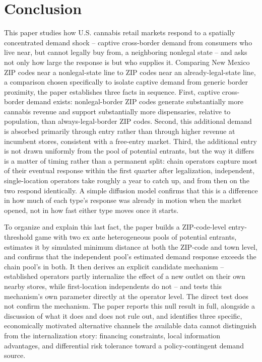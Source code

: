 \documentclass[english,12pt]{article}
\begin{document}
\section{Conclusion}
\label{conclusion}

This paper studies how U.S. cannabis retail markets respond to a spatially concentrated demand shock -- captive cross-border demand from consumers who live near, but cannot legally buy from, a neighboring nonlegal state -- and asks not only how large the response is but who supplies it. Comparing New Mexico ZIP codes near a nonlegal-state line to ZIP codes near an already-legal-state line, a comparison chosen specifically to isolate captive demand from generic border proximity, the paper establishes three facts in sequence. First, captive cross-border demand exists: nonlegal-border ZIP codes generate substantially more cannabis revenue and support substantially more dispensaries, relative to population, than always-legal-border ZIP codes. Second, this additional demand is absorbed primarily through entry rather than through higher revenue at incumbent stores, consistent with a free-entry market. Third, the additional entry is not drawn uniformly from the pool of potential entrants, but the way it differs is a matter of timing rather than a permanent split: chain operators capture most of their eventual response within the first quarter after legalization, independent, single-location operators take roughly a year to catch up, and from then on the two respond identically. A simple diffusion model confirms that this is a difference in how much of each type's response was already in motion when the market opened, not in how fast either type moves once it starts.

To organize and explain this last fact, the paper builds a ZIP-code-level entry-threshold game with two ex ante heterogeneous pools of potential entrants, estimates it by simulated minimum distance at both the ZIP-code and town level, and confirms that the independent pool's estimated demand response exceeds the chain pool's in both. It then derives an explicit candidate mechanism -- established operators partly internalize the effect of a new outlet on their own nearby stores, while first-location independents do not -- and tests this mechanism's own parameter directly at the operator level. The direct test does not confirm the mechanism. The paper reports this null result in full, alongside a discussion of what it does and does not rule out, and identifies three specific, economically motivated alternative channels the available data cannot distinguish from the internalization story: financing constraints, local information advantages, and differential risk tolerance toward a policy-contingent demand source.
\end{document}

